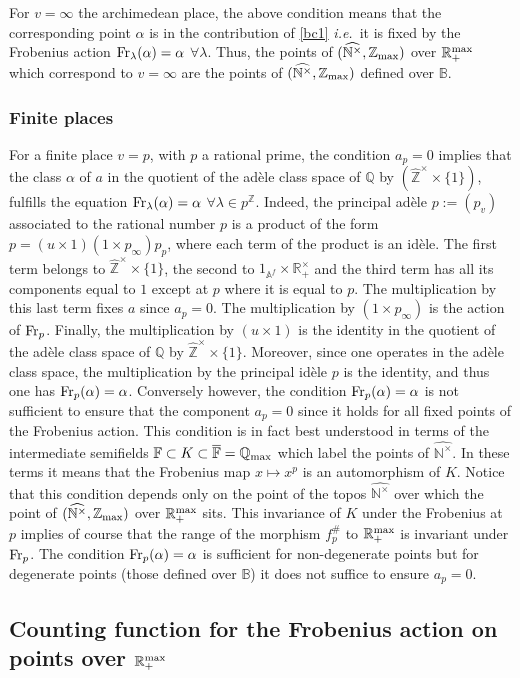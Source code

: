 \documentclass[noams,lp]{compositio}
\def\A{{\mathbb A}}
\def\B{{\mathbb B}}
\def\F{{\mathbb F}}
\def\N{{\mathbb N}}
\def\Q{{\mathbb Q}}
\def\R{{\mathbb R}}
\def\Z{{\mathbb Z}}
\newcommand{\ie}{{\it i.e.\/}\ }
\def\zmax{{\Z_{\rm max}}}
\def\rmax{\R_+^{\rm max}}
\def\fr{{\rm Fr}}
\def\arith{{(\wnt,\bar \N)}}
\def\wnt{{\widehat{\N^{\times}}}}
\def\arith{{(\wnt,\zmax)}}
\def\hatz{{\hat\Z^\times}}
\begin{document}
For $v=\infty$ the archimedean place, the above condition means that the corresponding point $\alpha$ is in the contribution of \eqref{bc1} \ie it is fixed by the Frobenius action $\fr_\lambda(\alpha)=\alpha$ $\forall\lambda$. Thus, the points of $\arith$ over $\rmax$ which correspond to $v=\infty$ are the points of $\arith$ defined over $\B$. 


\subsubsection*{Finite places} For a finite place $v=p$, with $p$  a rational prime, the condition $a_p=0$ implies that the class $\alpha$ of $a$ in the  quotient of the ad\`ele class space of $\Q$ by $(\hatz\times \{1\})$, fulfills the equation $\fr_\lambda(\alpha)=\alpha$  $\forall\lambda \in p^\Z$. Indeed, the principal ad\`ele $p:=(p_v)$ associated to the rational number $p$ is a product of the form
$
p=(u\times 1)(1\times p_\infty)p_p
$,
where each term of the product is an id\`ele. The first term belongs to $\hatz\times \{1\}$, the second to $1_{\A^f}\times \R_+^\times$ and the third term has all its components equal to $1$ except at $p$ where it is equal to $p$. The multiplication by this last term fixes $a$ since $a_p=0$. The multiplication by $(1\times p_\infty)$ is the action of $\fr_p$. Finally, the multiplication by $(u\times 1)$ is the identity in the  quotient of the ad\`ele class space of $\Q$ by $\hatz\times \{1\}$. Moreover, since one operates in the ad\`ele class space, the multiplication by the principal id\`ele $p$ is the identity, and thus one has $\fr_p(\alpha)=\alpha$. Conversely however, the condition $\fr_p(\alpha)=\alpha$ is not sufficient to ensure that the component $a_p=0$ since it holds for all fixed points of the Frobenius action. This condition is in fact best understood in terms of the intermediate semifields $\F\subset K\subset \overline{\F}=\Q_{\rm max}$ which label the points of $\wnt$. In these terms it means that the Frobenius map $x\mapsto x^p$ is an automorphism of $K$. Notice that this condition depends only on the point of the topos $\wnt $ over which the point of $\arith$ over $\rmax$ sits. This invariance of $K$ under the Frobenius at $p$ implies of course that the range of the  morphism $f^\#_p$ to $\rmax$ is invariant under $\fr_p$. The condition $\fr_p(\alpha)=\alpha$ is sufficient for non-degenerate points but for degenerate points (those defined over $\B$) it does not suffice to ensure  $a_p=0$.

\subsection{Counting function for  the Frobenius action on points over $\rmax$}\label{periodicsect}
\end{document}
